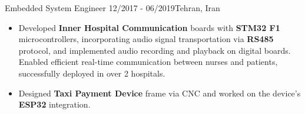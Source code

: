 \resumeSubheadingReza
{Embedded System Engineer}{}
{12/2017 - 06/2019}{Tehran, Iran}
{
    \vspace{-12pt}
    \begin{itemize}
        \item{Developed \textbf{Inner Hospital Communication} boards with \textbf{STM32 F1} microcontrollers, incorporating audio signal transportation via \textbf{RS485} protocol, and implemented audio recording and playback on digital boards. Enabled efficient real-time communication between nurses and patients, successfully deployed in over 2 hospitals.}
        \item{Designed \textbf{Taxi Payment Device} frame via CNC and worked on the device's \textbf{ESP32} integration.}
    \end{itemize}
}

